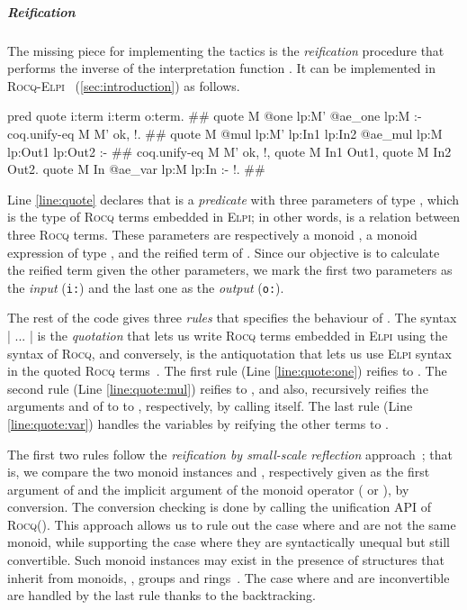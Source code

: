 \documentclass[a4paper,UKenglish,cleveref,autoref]{lipics-v2021}
\newcommand{\Rocq}{{\sffamily\scshape Rocq}\xspace}
\newcommand{\Elpi}{{\sffamily\scshape Elpi}\xspace}
\newcommand{\RocqElpi}{{\sffamily\scshape Rocq-Elpi}\xspace}
\begin{document}
\subparagraph{Reification}
The missing piece for implementing the  tactics is the \emph{reification}
procedure that performs the inverse of the interpretation function .
It can be implemented in \RocqElpi~\cite{Tassi:habilitation} (\cref{sec:introduction}) as follows.
\begin{elpicode}
pred quote i:term i:term o:term. #\label{line:quote}#
quote M {{ @one lp:M' }} {{ @ae_one lp:M }} :- coq.unify-eq M M' ok, !. #\label{line:quote:one}#
quote M {{ @mul lp:M' lp:In1 lp:In2 }} {{ @ae_mul lp:M lp:Out1 lp:Out2 }} :- #\label{line:quote:mul}#
  coq.unify-eq M M' ok, !, quote M In1 Out1, quote M In2 Out2.
quote M In {{ @ae_var lp:M lp:In }} :- !. #\label{line:quote:var}#
\end{elpicode}
Line \ref{line:quote} declares that  is a \emph{predicate} with three parameters of type
, which is the type of \Rocq terms embedded in \Elpi; in other words,  is a
relation between three \Rocq terms.
These parameters are respectively a monoid , a monoid expression  of type ,
and the reified term  of .
Since our objective is to calculate the reified term given the other parameters, we mark the first
two parameters as the \emph{input} (\texttt{i:}) and the last one as the \emph{output}
(\texttt{o:}).

The rest of the code gives three \emph{rules} that specifies the behaviour of .
The syntax \elpi|{{ ... }}| is the \emph{quotation} that lets us write \Rocq terms embedded in \Elpi
using the syntax of \Rocq, and conversely,  is the antiquotation that lets us use \Elpi
syntax in the quoted \Rocq terms~\cite[Section 3.4.1]{Tassi:habilitation}.
%
The first rule (Line \ref{line:quote:one}) reifies  to .
The second rule (Line \ref{line:quote:mul}) reifies  to , and also,
recursively reifies the arguments  and  of  to  to
, respectively, by calling  itself.
The last rule (Line \ref{line:quote:var}) handles the variables by reifying the other terms to
.

The first two rules follow the \emph{reification by small-scale reflection}
approach~\cite[Section 3.2]{DBLP:conf/itp/Sakaguchi22}; that is, we compare the two monoid instances
 and , respectively given as the first argument of  and the implicit
argument of the monoid operator ( or ), by conversion. The conversion checking
is done by calling the unification API of \Rocq ().
This approach allows us to rule out the case where  and  are not the same monoid,
while supporting the case where they are syntactically unequal but still convertible.
Such monoid instances may exist in the presence of structures that inherit from monoids, \eg, groups
and rings~\cite{DBLP:conf/cade/AffeldtCKMRS20}.
The case where  and  are inconvertible are handled by the last rule thanks to the
backtracking.
\end{document}
